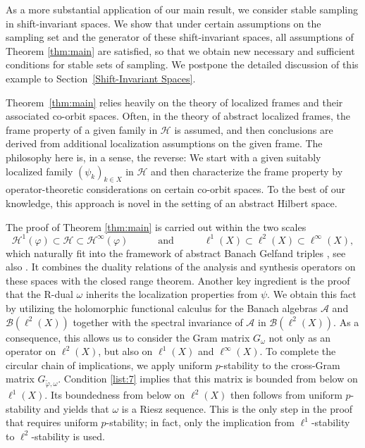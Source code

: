 \documentclass{amsart}
\def\Hil{\mathcal{H}}
\newcommand{\B}[0]{{\mathcal{B}}}
\newcommand{\A}[0]{{\mathcal{A}}}
\def\lukas{\color{blue}}
\begin{document}
As a more substantial application of our main result, we consider stable sampling in shift-invariant spaces. We show that under certain assumptions on the sampling set and the generator of these shift-invariant spaces, all assumptions of Theorem \ref{thm:main} are satisfied, so that we obtain new necessary and sufficient conditions for stable sets of sampling. We postpone the detailed discussion of this example to Section~\ref{Shift-Invariant Spaces}.

Theorem~\ref{thm:main} relies heavily on the theory of localized frames and their associated co-orbit spaces. Often, in the theory of abstract localized frames, the frame property of a given family in $\Hil$ is assumed, and then conclusions are derived from additional localization assumptions on the given frame. %
The philosophy here is, in a sense, the reverse: We start with a given suitably localized family $(\psi_k)_{k\in X}$ in $\Hil$ and then characterize the frame property by operator-theoretic considerations on certain co-orbit spaces. To the best of our knowledge, this approach is novel in the setting of an abstract Hilbert space. 

The proof of Theorem \ref{thm:main} is carried out within the two scales 
$$\Hil^1(\varphi) \subset \Hil \subset \Hil^{\infty}(\varphi) \quad \qquad \text{and} \qquad \quad \ell^1(X) \subset \ell^2(X) \subset \ell^{\infty}(X),$$
which naturally fit into the framework of abstract Banach Gelfand
triples \cite{feilucor08}, see also \cite{haubakoe25}. It combines the duality relations of the analysis and synthesis operators on these spaces with the closed range theorem. Another key ingredient is the proof that the R-dual $\omega$ inherits the localization properties from $\psi$. We obtain this fact by utilizing the holomorphic functional calculus for the Banach algebras $\A$ and $\B(\ell^2(X))$ together with the spectral invariance of $\A$ in $\B(\ell^2(X))$.  As a consequence, this allows us to consider the Gram matrix $G_{\omega}$ not only as an operator on $\ell^2(X)$, but also on $\ell^1(X)$ and $\ell^{\infty}(X)$. To complete the circular chain of implications, we apply uniform $p$-stability to the cross-Gram matrix \(G_{\widetilde{\varphi},\omega}\). Condition \ref{list:7} implies that this matrix is bounded from below on \(\ell^1(X)\). Its boundedness from below on \(\ell^2(X)\) then follows from uniform $p$-stability and yields that \(\omega\) is a Riesz sequence. This is the only step in the proof that requires uniform $p$-stability; in fact, only the implication from \(\ell^1\)-stability to \(\ell^2\)-stability is used.
\end{document}
